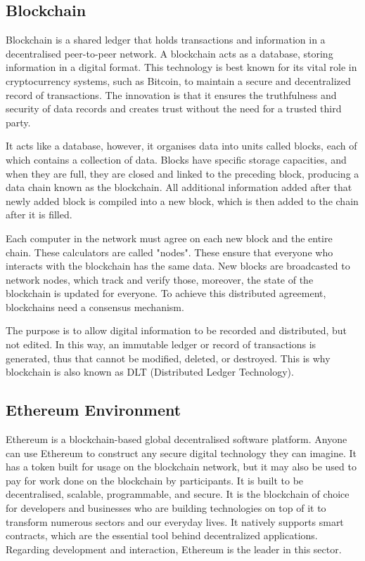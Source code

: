 \documentclass[a4paper,sigconf, language=french,
language=german, language=spanish, language=english]{acmart}
\begin{document}
\subsection{Blockchain}

Blockchain is a shared ledger that holds transactions and information in a decentralised peer-to-peer network. A blockchain acts as a database, storing information in a digital format. 
This technology is best known for its vital role in cryptocurrency systems, such as Bitcoin, to maintain a secure and decentralized record of transactions. 
The innovation is that it ensures the truthfulness and security of data records and creates trust without the need for a trusted third party.

It acts like a database, however, it organises data into units called blocks, each of which contains a collection of data.
Blocks have specific storage capacities, and when they are full, they are closed and linked to the preceding block, producing a data chain known as the blockchain.
All additional information added after that newly added block is compiled into a new block, which is then added to the chain after it is filled.  

Each computer in the network must agree on each new block and the entire chain. 
These calculators are called "nodes". These ensure that everyone who interacts with the blockchain has the same data. 
New blocks are broadcasted to network nodes, which track and verify those, moreover, the state of the blockchain is updated for everyone.
To achieve this distributed agreement, blockchains need a consensus mechanism. 

The purpose is to allow digital information to be recorded and distributed, but not edited. 
In this way, an immutable ledger or record of transactions is generated, thus that cannot be modified, deleted, or destroyed. 
This is why blockchain is also known as DLT (Distributed Ledger Technology). 


\subsection{Ethereum Environment}

Ethereum is a blockchain-based global decentralised software platform. 
Anyone can use Ethereum to construct any secure digital technology they can imagine.
It has a token built for usage on the blockchain network, but it may also be used to pay for work done on the blockchain by participants. 
It is built to be decentralised, scalable, programmable, and secure. It is the blockchain of choice for developers and businesses who are building technologies on top of it to transform numerous sectors and our everyday lives.
It natively supports smart contracts, which are the essential tool behind decentralized applications. Regarding development and interaction, Ethereum is the leader in this sector. 
\end{document}
